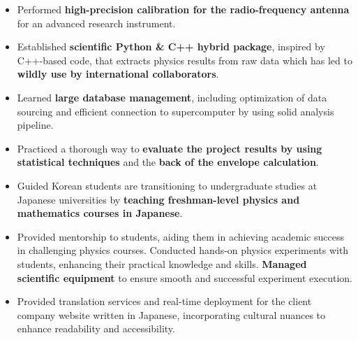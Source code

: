 \documentclass[10pt,a4paper,ragged2e,withhyper]{altacv}
\begin{document}
\begin{paracol}{2}

\begin{itemize}
\item Performed {\bf high-precision calibration for the radio-frequency antenna} for an advanced research instrument.
\item Established {\bf scientific Python \& C++ hybrid package}, inspired by C++-based code, that extracts physics results from raw data which has led to {\bf wildly use by international collaborators}.
\item Learned {\bf large database management}, including optimization of data sourcing and efficient connection to supercomputer by using solid analysis pipeline.
\item Practiced a thorough way to {\bf evaluate the project results by using statistical techniques} and the {\bf back of the envelope calculation}.
\end{itemize}
\divider

\begin{itemize}
\item Guided Korean students are transitioning to undergraduate studies at Japanese universities by {\bf teaching freshman-level physics and mathematics courses in Japanese}.
\item Provided mentorship to students, aiding them in achieving academic success in challenging physics courses. Conducted hands-on physics experiments with students, enhancing their practical knowledge and skills. {\bf Managed scientific equipment} to ensure smooth and successful experiment execution.
\end{itemize}
\divider

\begin{itemize}
\item Provided translation services and real-time deployment for the client company website written in Japanese, incorporating cultural nuances to enhance readability and accessibility.
\end{itemize}
\medskip





\end{paracol}
\end{document}
